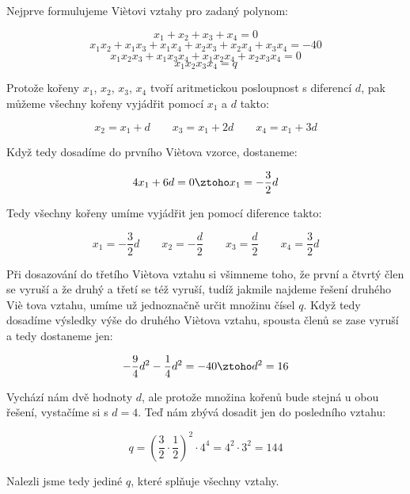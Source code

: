 \documentclass{fkssolpub}
\author{Ondřej Sedláček}
\begin{document}
Nejprve formulujeme Vi\` etovi vztahy pro zadaný polynom:

\[
	x_1 + x_2 + x_3 + x_4 = 0
\]
\[
	x_1 x_2 + x_1 x_3 + x_1 x_4 + x_2 x_3 + x_2 x_4 + x_3 x_4 = -40
\]
\[
	x_1 x_2 x_3 + x_1 x_3 x_4 + x_1 x_2 x_4 + x_2 x_3 x_4 = 0
\]
\[
	x_1 x_2 x_3 x_4 = q
\]

Protože kořeny $x_1$, $x_2$, $x_3$, $x_4$ tvoří aritmetickou posloupnost s diferencí $d$, pak můžeme všechny kořeny vyjádřit pomocí $x_1$ a $d$ takto:

\[
	x_2 = x_1 + d \qquad x_3 = x_1 + 2d \qquad x_4 = x_1 + 3d
\]

Když tedy dosadíme do prvního Vi\`etova vzorce, dostaneme:

\[
	4x_1 + 6d = 0 \ztoho x_1 = -\frac{3}{2} d
\]

Tedy všechny kořeny umíme vyjádřit jen pomocí diference takto:

\[
	x_1 = - \frac{3}{2} d \qquad x_2 = - \frac{d}{2} \qquad x_3 = \frac{d}{2} \qquad x_4 = \frac{3}{2} d
\]

Při dosazování do třetího Vi\` etova vztahu si všimneme toho, že první a čtvrtý člen se vyruší a že druhý a třetí se též vyruší, tudíž jakmile najdeme řešení druhého Vi\` e tova vztahu, umíme už jednoznačně určit množinu čísel $q$. Když tedy dosadíme výsledky výše do druhého Vi\` etova vztahu, spousta členů se zase vyruší a tedy dostaneme jen:

\[
	-\frac{9}{4} d^2 - \frac{1}{4} d^2 = -40 \ztoho d^2 = 16
\]

Vychází nám dvě hodnoty $d$, ale protože množina kořenů bude stejná u obou řešení, vystačíme si s $d = 4$. Teď nám zbývá dosadit jen do posledního vztahu:

\[
	q = \left(\frac{3}{2} \cdot \frac{1}{2}\right)^2 \cdot 4^4 = 4^2 \cdot 3^2 = 144
\]

Nalezli jsme tedy jediné $q$, které splňuje všechny vztahy.
\end{document}
